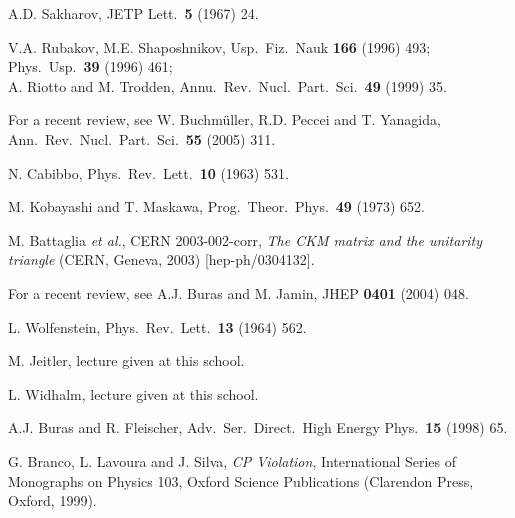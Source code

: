 \documentclass[12pt]{article}
\begin{document}
\begin{thebibliography}{999}
A.D. Sakharov,
 { JETP Lett.}~{\bf 5} (1967) 24.
  
V.A. Rubakov, M.E. Shaposhnikov, 
{ Usp.\ Fiz.\ Nauk} {\bf 166} (1996) 493; 
{ Phys.\ Usp.}~{\bf 39} (1996) 461;\\
A. Riotto and M. Trodden, { Annu.\ Rev.\ Nucl.\ Part.\ 
Sci.}~{\bf 49} (1999) 35.

For a recent review, see W. Buchm\"uller, R.D. Peccei 
and T. Yanagida,
  Ann.\ Rev.\ Nucl.\ Part.\ Sci.\  {\bf 55} (2005) 311.

N. Cabibbo,
  { Phys.\ Rev.\ Lett.}~{\bf 10} (1963) 531.

M. Kobayashi and T. Maskawa,
{ Prog.\ Theor.\ Phys.}~{\bf 49} (1973) 652.

M. Battaglia {\it et al.}, CERN 2003-002-corr,
{\it The CKM matrix and the unitarity triangle}
(CERN, Geneva, 2003) [hep-ph/0304132].

For a recent review, see A.J. Buras and M. Jamin,
  { JHEP} {\bf 0401} (2004) 048.

L. Wolfenstein,
  { Phys.\ Rev.\ Lett.}~{\bf 13} (1964) 562.
  
M. Jeitler, lecture given at this school.

L. Widhalm, lecture given at this school.

  A.J. Buras and R. Fleischer,
Adv.\ Ser.\ Direct.\ High Energy Phys.\  {\bf 15} (1998) 65.

G. Branco, L. Lavoura 
and J. Silva,  {\it CP Violation}, International Series of Monographs on 
Physics 103, Oxford Science Publications (Clarendon Press, Oxford, 1999).


\end{thebibliography}
\end{document}
